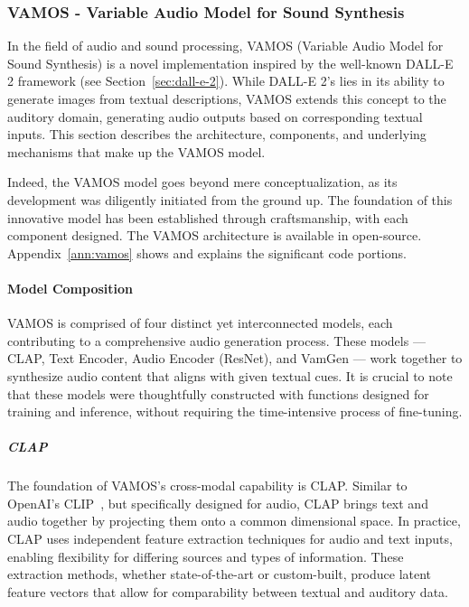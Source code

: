 \subsubsection{VAMOS - Variable Audio Model for Sound Synthesis}

In the field of audio and sound processing, VAMOS (Variable Audio Model for Sound Synthesis) is a novel implementation inspired by the well-known DALL-E 2 framework (see Section~\ref{sec:dall-e-2}). While DALL-E 2's lies in its ability to generate images from textual descriptions, VAMOS extends this concept to the auditory domain, generating audio outputs based on corresponding textual inputs. This section describes the architecture, components, and underlying mechanisms that make up the VAMOS model.

Indeed, the VAMOS model goes beyond mere conceptualization, as its development was diligently initiated from the ground up. The foundation of this innovative model has been established through craftsmanship, with each component designed. The VAMOS architecture is available in open-source. Appendix~\ref{ann:vamos} shows and explains the significant code portions.

\paragraph{Model Composition}

VAMOS is comprised of four distinct yet interconnected models, each contributing to a comprehensive audio generation process. These models — CLAP, Text Encoder, Audio Encoder (ResNet), and VamGen — work together to synthesize audio content that aligns with given textual cues. It is crucial to note that these models were thoughtfully constructed with functions designed for training and inference, without requiring the time-intensive process of fine-tuning.

\subparagraph{CLAP}

The foundation of VAMOS's cross-modal capability is CLAP. Similar to OpenAI's CLIP~\cite{radford_learning_2021}, but specifically designed for audio, CLAP brings text and audio together by projecting them onto a common dimensional space. In practice, CLAP uses independent feature extraction techniques for audio and text inputs, enabling flexibility for differing sources and types of information. These extraction methods, whether state-of-the-art or custom-built, produce latent feature vectors that allow for comparability between textual and auditory data.

